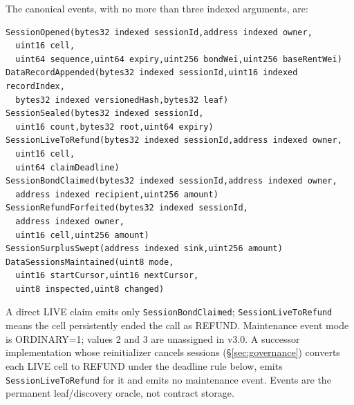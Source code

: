 \documentclass[a4paper,11pt]{article}
\newcommand{\code}[1]{\nolinkurl{#1}}
\begin{document}
The canonical events, with no more than three indexed arguments, are:
\begin{verbatim}
SessionOpened(bytes32 indexed sessionId,address indexed owner,
  uint16 cell,
  uint64 sequence,uint64 expiry,uint256 bondWei,uint256 baseRentWei)
DataRecordAppended(bytes32 indexed sessionId,uint16 indexed recordIndex,
  bytes32 indexed versionedHash,bytes32 leaf)
SessionSealed(bytes32 indexed sessionId,
  uint16 count,bytes32 root,uint64 expiry)
SessionLiveToRefund(bytes32 indexed sessionId,address indexed owner,
  uint16 cell,
  uint64 claimDeadline)
SessionBondClaimed(bytes32 indexed sessionId,address indexed owner,
  address indexed recipient,uint256 amount)
SessionRefundForfeited(bytes32 indexed sessionId,
  address indexed owner,
  uint16 cell,uint256 amount)
SessionSurplusSwept(address indexed sink,uint256 amount)
DataSessionsMaintained(uint8 mode,
  uint16 startCursor,uint16 nextCursor,
  uint8 inspected,uint8 changed)
\end{verbatim}
A direct LIVE claim emits only \code{SessionBondClaimed};
\code{SessionLiveToRefund} means the cell persistently ended the call as REFUND.
Maintenance event mode is ORDINARY=1; values 2 and 3 are unassigned in v3.0.
A successor implementation whose reinitializer cancels sessions
(\S\ref{sec:governance}) converts each LIVE cell to REFUND under the deadline
rule below, emits \code{SessionLiveToRefund} for it and emits no maintenance
event.  Events are the permanent leaf/discovery oracle, not contract storage.
\end{document}
